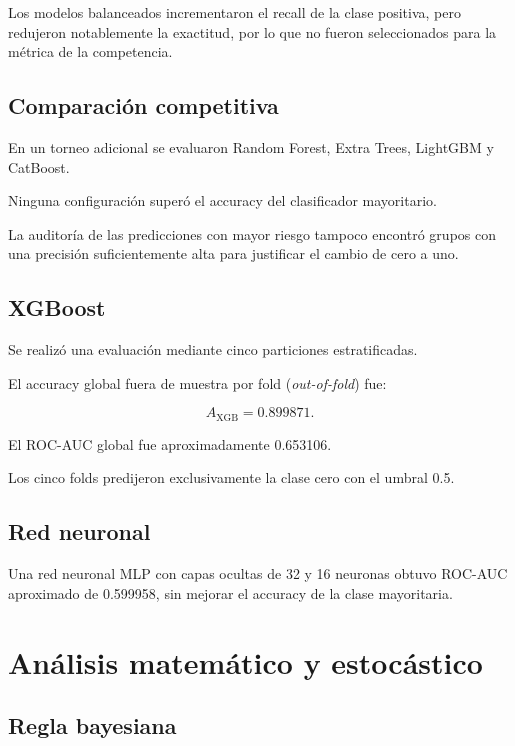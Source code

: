 ﻿\documentclass[11pt,a4paper]{article}
\begin{document}
Los modelos balanceados incrementaron el recall
de la clase positiva, pero redujeron notablemente
la exactitud, por lo que no fueron seleccionados
para la métrica de la competencia.

\subsection{Comparación competitiva}

En un torneo adicional se evaluaron Random Forest,
Extra Trees, LightGBM y CatBoost.

Ninguna configuración superó el accuracy del
clasificador mayoritario.

La auditoría de las predicciones con mayor riesgo
tampoco encontró grupos con una precisión
suficientemente alta para justificar el cambio
de cero a uno.

\subsection{XGBoost}

Se realizó una evaluación mediante cinco
particiones estratificadas.

El accuracy global fuera de muestra por fold
(\emph{out-of-fold}) fue:

\[
A_{\mathrm{XGB}}=0.899871.
\]

El ROC-AUC global fue aproximadamente 0.653106.

Los cinco folds predijeron exclusivamente
la clase cero con el umbral 0.5.

\subsection{Red neuronal}

Una red neuronal MLP con capas ocultas
de 32 y 16 neuronas obtuvo ROC-AUC aproximado
de 0.599958, sin mejorar el accuracy
de la clase mayoritaria.

\section{Análisis matemático y estocástico}

\subsection{Regla bayesiana}
\end{document}
